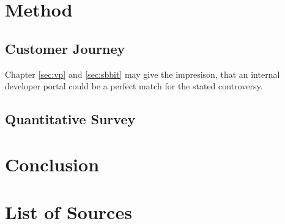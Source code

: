 \documentclass[a4paper,12pt]{article}
\begin{document}
    \section{Method}
    \label{sec:method}

    \subsection{Customer Journey}
    Chapter \ref{sec:vp} and \ref{sec:sbbit} may give the impresison, that an internal developer portal could be a perfect
    match for the stated controversy.

    \subsection{Quantitative Survey}


    \section{Conclusion}
    \label{sec:conclusion}
    \pagebreak


    \section{List of Sources}
    \label{sec:bibliograhpy}
    \printbibliography[heading=none]
\end{document}
